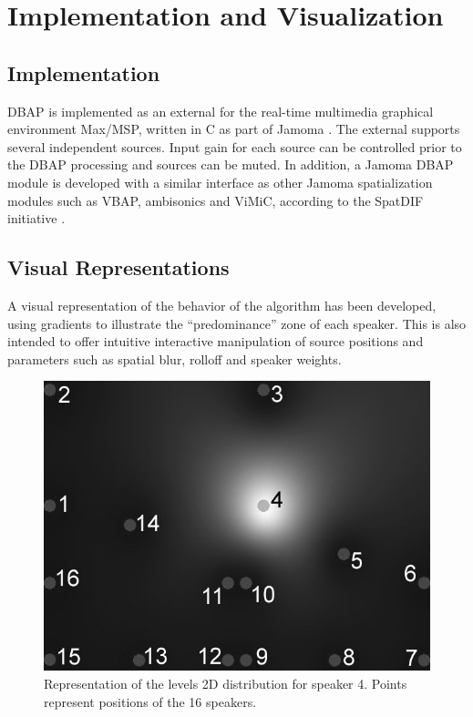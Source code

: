 \documentclass[twoside,10pt]{article}
\begin{document}
\section{Implementation and Visualization}

\subsection{Implementation}
\label{sec:implementation}

DBAP is implemented as an external for the real-time multimedia graphical environment Max/MSP, written in C as part of Jamoma \cite{Place:2006jamoma}. The external supports several independent sources. Input gain for each source can be controlled prior to the DBAP processing and sources can be muted.  In addition, a Jamoma DBAP module is developed with a similar interface as other Jamoma spatialization modules such as VBAP, ambisonics and ViMiC, according to the SpatDIF initiative \cite{Peters:2008spatdif}.



\subsection{Visual Representations}
\label{sec:visual_representation}


A visual representation of the behavior of the algorithm has been developed, using gradients to illustrate the ``predominance'' zone of each speaker. This is also intended to offer intuitive interactive manipulation of source positions and parameters such as spatial blur, rolloff and speaker weights.

\begin{figure}[ht]
\centerline{\includegraphics[scale=0.5]{spk4_r_6_b_0+nbrs}}
\caption{{Representation of the levels 2D distribution for speaker 4. Points represent positions of the 16 speakers.}}  
\label{fig:1spk}
\end{figure}
\end{document}
